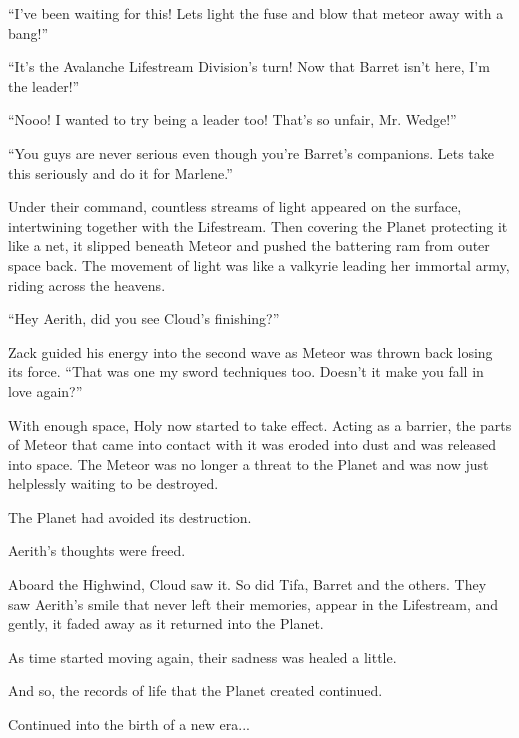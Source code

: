 \documentclass[oneside]{book}
\begin{document}
“I've been waiting for this! Lets light the fuse and blow that meteor away with a bang!”

“It's the Avalanche Lifestream Division's turn! Now that Barret isn't here, I'm the leader!”

“Nooo! I wanted to try being a leader too! That's so unfair, Mr. Wedge!”

“You guys are never serious even though you're Barret's companions. Lets take this seriously and do it for Marlene.”

Under their command, countless streams of light appeared on the surface, intertwining together with the Lifestream. Then covering the Planet protecting it like a net, it slipped beneath Meteor and pushed the battering ram from outer space back. The movement of light was like a valkyrie leading her immortal army, riding across the heavens.

“Hey Aerith, did you see Cloud's finishing?”

Zack guided his energy into the second wave as Meteor was thrown back losing its force. “That was one my sword techniques too. Doesn't it make you fall in love again?”

With enough space, Holy now started to take effect. Acting as a barrier, the parts of Meteor that came into contact with it was eroded into dust and was released into space. The Meteor was no longer a threat to the Planet and was now just helplessly waiting to be destroyed.

The Planet had avoided its destruction.

Aerith's thoughts were freed.

Aboard the Highwind, Cloud saw it. So did Tifa, Barret and the others. They saw Aerith's smile that never left their memories, appear in the Lifestream, and gently, it faded away as it returned into the Planet.

As time started moving again, their sadness was healed a little.

And so, the records of life that the Planet created continued.

Continued into the birth of a new era...
\end{document}
